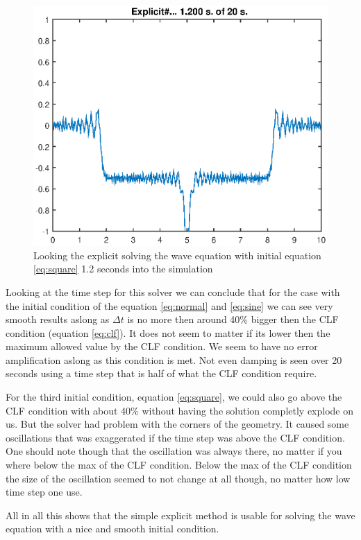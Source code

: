 \documentclass[11pt]{article}
\begin{document}
\begin{figure}[H]
	\centering
	\includegraphics[width=1\textwidth]{../explicitSquare}
	\caption{Looking the explicit solving the wave equation with initial equation 
	\ref{eq:square} 1.2 seconds into the simulation}
	\label{fig:explicitSquare}
\end{figure}
Looking at the time step for this solver we can conclude that for the case with the initial condition of the equation \ref{eq:normal} and \ref{eq:sine} we can see very smooth results aslong as $\Delta t$ is no more then around 40\% bigger then the CLF condition (equation \ref{eq:clf}). It does not seem to matter if its lower then the maximum allowed value by the CLF condition. We seem to have no error amplification aslong as this condition is met. Not even damping is seen over 20 seconds using a time step that is half of what the CLF condition require.   

For the third initial condition, equation \ref{eq:square}, we could also go above the CLF condition with about 40\% without having the solution completly explode on us. But the solver had problem with the corners of the geometry. It caused some oscillations that was exaggerated if the time step was above the CLF condition. One should note though that the oscillation was always there, no matter if you where below the max of the CLF condition. Below the max of the CLF condition the size of the oscillation seemed to not change at all though, no matter how low time step one use.

All in all this shows that the simple explicit method is usable for solving the wave equation with a nice and smooth initial condition.  
\end{document}

